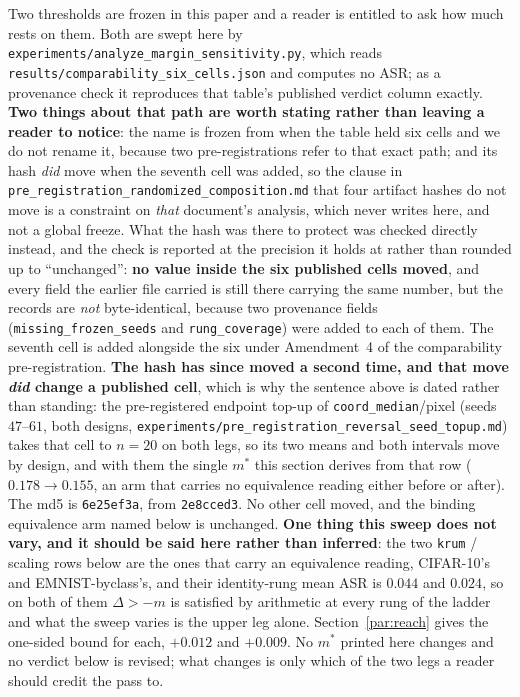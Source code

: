\documentclass{article}
\begin{document}
Two thresholds are frozen in this paper and a reader is entitled to ask how much rests on them.
Both are swept here by \texttt{experiments/analyze\_margin\_sensitivity.py}, which reads
\texttt{results/comparability\_six\_cells.json} and computes no ASR; as a provenance check it
reproduces that table's published verdict column exactly. \textbf{Two things about that path are
worth stating rather than leaving a reader to notice}: the name is frozen from when the table held
six cells and we do not rename it, because two pre-registrations refer to that exact path; and its
hash \emph{did} move when the seventh cell was added, so the clause in
\texttt{pre\_registration\_randomized\_composition.md} that four artifact hashes do not move is a
constraint on \emph{that} document's analysis, which never writes here, and not a global freeze.
What the hash was there to protect was checked directly instead, and the check is reported at the
precision it holds at rather than rounded up to ``unchanged'': \textbf{no value inside the six
published cells moved}, and every field the earlier file carried is still there carrying the same
number, but the records are \emph{not} byte-identical, because two provenance fields
(\texttt{missing\_frozen\_seeds} and \texttt{rung\_coverage}) were added to each of them. The
seventh cell is added alongside the six under Amendment~4 of the comparability pre-registration.
\textbf{The hash has since moved a second time, and that move \emph{did} change a published cell},
which is why the sentence above is dated rather than standing: the pre-registered endpoint top-up of
\texttt{coord\_median}/pixel (seeds $47$--$61$, both designs,
\texttt{experiments/\allowbreak pre\_registration\_reversal\_seed\_topup.md}) takes that cell to
$n{=}20$ on both legs, so its two means and both intervals move by design, and with them the single
$m^{\ast}$ this section derives from that row ($0.178 \to 0.155$, an arm that carries no equivalence
reading either before or after). The md5 is \texttt{6e25ef3a}, from \texttt{2e8cced3}. No other cell
moved, and the binding equivalence arm named below is unchanged.
\textbf{One thing this sweep does not vary, and it should be said here rather than inferred}: the two
\texttt{krum} / scaling rows below are the ones that carry an equivalence reading, CIFAR-10's and
EMNIST-byclass's, and their identity-rung mean ASR is $0.044$ and $0.024$, so on both of them $\Delta > -m$
is satisfied by arithmetic at every rung of the ladder and what the sweep varies is the upper leg alone.
Section~\ref{par:reach} gives the one-sided bound for each, $+0.012$ and $+0.009$. No $m^{\ast}$ printed here changes and no
verdict below is revised; what changes is only which of the two legs a reader should credit the pass to.
\end{document}
